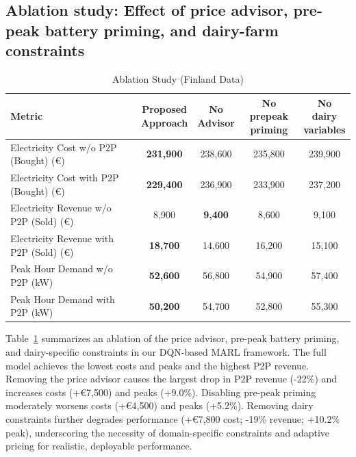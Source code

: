 \documentclass[preprint,12pt]{elsarticle}
\begin{document}
\subsection{Ablation study: Effect of price advisor, pre-peak battery priming, and dairy-farm constraints}


\begin{table}[ht]
\caption{Ablation Study (Finland Data)}
\centering
\small
\begin{tabular}{lcccc}
\hline
\textbf{Metric} & \makecell{\textbf{Proposed}\\\textbf{Approach}} & \makecell{\textbf{No }\\\textbf{Advisor}} & \makecell{\textbf{No prepeak}\\\textbf{priming}} & \makecell{\textbf{No dairy}\\\textbf{variables}} \\
\hline
Electricity Cost w/o P2P (Bought) (€) & \textbf{231,900} & 238,600 & 235,800 & 239,900 \\
Electricity Cost with P2P (Bought) (€) & \textbf{229,400} & 236,900 & 233,900 & 237,200 \\
Electricity Revenue w/o P2P (Sold) (€) & 8,900 & \textbf{9,400} & 8,600 & 9,100 \\
Electricity Revenue with P2P (Sold) (€) & \textbf{18,700} & 14,600 & 16,200 & 15,100 \\
Peak Hour Demand w/o P2P (kW) & \textbf{52,600} & 56,800 & 54,900 & 57,400 \\
Peak Hour Demand with P2P (kW) & \textbf{50,200} & 54,700 & 52,800 & 55,300 \\
\hline
\end{tabular}
\label{tab:ablation_finland}
\end{table}


Table~\ref{tab:ablation_finland} summarizes an ablation of the price advisor, pre-peak battery priming, and dairy-specific constraints in our DQN-based MARL framework. The full model achieves the lowest costs and peaks and the highest P2P revenue. Removing the price advisor causes the largest drop in P2P revenue (-22\%) and increases costs (+€{}7{,}500) and peaks (+9.0\%). Disabling pre-peak priming moderately worsens costs (+€{}4{,}500) and peaks (+5.2\%). Removing dairy constraints further degrades performance (+€{}7{,}800 cost; -19\% revenue; +10.2\% peak), underscoring the necessity of domain-specific constraints and adaptive pricing for realistic, deployable performance.
\end{document}
